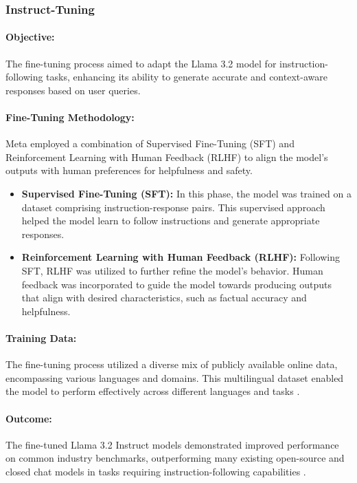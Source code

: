 \subsubsection{Instruct-Tuning}
\label{sssec:instruct-tuning}

\paragraph{Objective:} 
 The fine-tuning process aimed to adapt the Llama 3.2 model for instruction-following tasks, enhancing its ability to generate accurate and context-aware responses based on user queries.

\paragraph{Fine-Tuning Methodology:}
Meta employed a combination of Supervised Fine-Tuning (SFT) and Reinforcement Learning with Human Feedback (RLHF) to align the model's outputs with human preferences for helpfulness and safety.

\begin{itemize}
    \item \textbf{Supervised Fine-Tuning (SFT):}
    In this phase, the model was trained on a dataset comprising instruction-response pairs. This supervised approach helped the model learn to follow instructions and generate appropriate responses.
    
    \item \textbf{Reinforcement Learning with Human Feedback (RLHF):}
    Following SFT, RLHF was utilized to further refine the model's behavior. Human feedback was incorporated to guide the model towards producing outputs that align with desired characteristics, such as factual accuracy and helpfulness.
\end{itemize}

\paragraph{Training Data:}
The fine-tuning process utilized a diverse mix of publicly available online data, encompassing various languages and domains. This multilingual dataset enabled the model to perform effectively across different languages and tasks .

\paragraph{Outcome:}
The fine-tuned Llama 3.2 Instruct models demonstrated improved performance on common industry benchmarks, outperforming many existing open-source and closed chat models in tasks requiring instruction-following capabilities .

